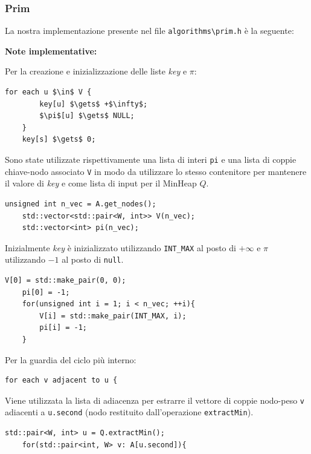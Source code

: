\documentclass[]{article}
\begin{document}
\subsubsection{Prim}
\begin{flushleft}
	La nostra implementazione presente nel file \verb|algorithms\prim.h| è la seguente:
	
	\lstset{language=c++, style=mystyle}
	
	
	\textbf{Note implementative:}
	
	\medskip
	Per la creazione e inizializzazione delle liste \textit{key} e $\pi$:
	\begin{lstlisting}[mathescape=true]
	for each u $\in$ V {
		key[u] $\gets$ +$\infty$;
		$\pi$[u] $\gets$ NULL;
	}
	key[s] $\gets$ 0;\end{lstlisting}
	Sono state utilizzate rispettivamente una lista di interi \verb|pi| e una lista di coppie chiave-nodo associato \verb|V| in modo da utilizzare lo stesso contenitore per mantenere il valore di \textit{key} e come lista di input per il MinHeap $Q$.
	\lstset{language=c++, style=mystyle, firstnumber=2}  	 	
	\begin{lstlisting}[mathescape=true]
	unsigned int n_vec = A.get_nodes();
	std::vector<std::pair<W, int>> V(n_vec);
	std::vector<int> pi(n_vec);\end{lstlisting}
	Inizialmente \textit{key} è inizializzato utilizzando \verb|INT_MAX| al posto di $+\infty$ e $\pi$ utilizzando $-1$ al posto di \verb|null|.
	\lstset{language=c++, style=mystyle, firstnumber=5}  	 	
	\begin{lstlisting}[mathescape=true]
	V[0] = std::make_pair(0, 0);
	pi[0] = -1;
	for(unsigned int i = 1; i < n_vec; ++i){
		V[i] = std::make_pair(INT_MAX, i);
		pi[i] = -1;
	}\end{lstlisting}
	
	Per la guardia del ciclo più interno:
	\begin{lstlisting}[mathescape=true]
	for each v adjacent to u {\end{lstlisting}
	Viene utilizzata la lista di adiacenza per estrarre il vettore di coppie nodo-peso \verb|v| adiacenti a \verb|u.second| (nodo restituito dall'operazione \verb|extractMin|).
	\lstset{language=c++, style=mystyle, firstnumber=13}  	 	
	\begin{lstlisting}[mathescape=true]
	std::pair<W, int> u = Q.extractMin();
	for(std::pair<int, W> v: A[u.second]){\end{lstlisting}
	

\end{flushleft}
\end{document}

